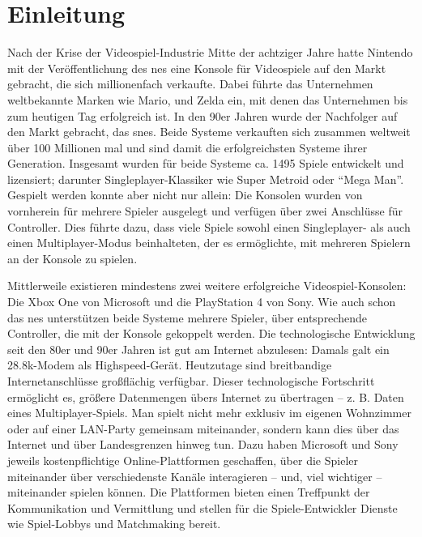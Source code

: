 
\chapter{Einleitung}\label{einleitung}

Nach der Krise der Videospiel-Industrie Mitte der achtziger Jahre hatte
Nintendo mit der Veröffentlichung des \gls{nes} eine Konsole für
Videospiele auf den Markt gebracht, die sich millionenfach verkaufte.
Dabei führte das Unternehmen weltbekannte Marken wie Mario,
 und Zelda ein, mit denen das Unternehmen bis zum
heutigen Tag erfolgreich ist. In den 90er Jahren wurde der Nachfolger
auf den Markt gebracht, das \gls{snes}. Beide Systeme verkauften sich
zusammen weltweit über 100 Millionen mal und sind damit die
erfolgreichsten Systeme ihrer Generation. Insgesamt wurden für beide
Systeme ca. 1495 Spiele entwickelt und lizensiert; darunter
Singleplayer-Klassiker wie Super Metroid oder \enquote{Mega Man}.
Gespielt werden konnte aber nicht nur allein: Die Konsolen wurden von
vornherein für mehrere Spieler ausgelegt und verfügen über zwei
Anschlüsse für Controller. Dies führte dazu, dass viele Spiele sowohl
einen Singleplayer- als auch einen Multiplayer-Modus beinhalteten, der
es ermöglichte, mit mehreren Spielern an der Konsole zu spielen.

Mittlerweile existieren mindestens zwei weitere erfolgreiche
Videospiel-Konsolen: Die Xbox One von Microsoft und die PlayStation 4
von Sony. Wie auch schon das \gls{nes} unterstützen beide Systeme
mehrere Spieler, über entsprechende Controller, die mit der Konsole
gekoppelt werden. Die technologische Entwicklung seit den 80er und 90er
Jahren ist gut am Internet abzulesen: Damals galt ein 28.8k-Modem als
Highspeed-Gerät. Heutzutage sind
breitbandige Internetanschlüsse großflächig verfügbar. Dieser
technologische Fortschritt ermöglicht es, größere Datenmengen übers
Internet zu übertragen -- z. B. Daten eines Multiplayer-Spiels. Man
spielt nicht mehr exklusiv im eigenen Wohnzimmer oder auf einer
LAN-Party gemeinsam miteinander, sondern kann dies über das Internet und
über Landesgrenzen hinweg tun. Dazu haben Microsoft und Sony jeweils
kostenpflichtige Online-Plattformen geschaffen, über die Spieler
miteinander über verschiedenste Kanäle interagieren -- und, viel
wichtiger -- miteinander spielen können. Die Plattformen bieten einen
Treffpunkt der Kommunikation und Vermittlung und stellen für die
Spiele-Entwickler Dienste wie Spiel-Lobbys und Matchmaking bereit.

